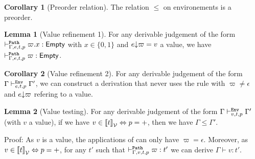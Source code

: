 \documentclass[a4paper]{article}
\theoremstyle{definition}
\newtheorem{lemma}{Lemma}
\newtheorem{corollary}{Corollary}
\begin{document}
        \begin{corollary}[Preorder relation]
          The relation $\leq$ on environements is a preorder.
        \end{corollary}

        \begin{lemma}[Value refinement 1]
          For any derivable judgement of the form $\pvdash \Gamma p e t \varpi.x:\Empty$ with $x\in\{0,1\}$ and $\occ e \varpi = v$ a value,
          we have $\pvdash \Gamma p e t \varpi:\Empty$.
        \end{lemma}

        \begin{corollary}[Value refinement 2]
          For any derivable judgement of the form $\Gamma \evdash p e t \Gamma'$, we can construct a derivation that
          never uses the rule  with $\varpi\neq\epsilon$ and $\occ e \varpi$ refering to a value.
        \end{corollary}

        \begin{lemma}[Value testing]
          For any derivable judgement of the form $\Gamma \evdash p v t \Gamma'$ (with $v$ a value), if we have $v \in \valsemantic{t} \Leftrightarrow p=+$,
          then we have $\Gamma\leq\Gamma'$.
        \end{lemma}
        Proof: As $v$ is a value, the applications of  can only have $\varpi=\epsilon$. Moreover, as $v \in \valsemantic{t} \Leftrightarrow p=+$,
        for any $t'$ such that $\pvdash \Gamma p v t \varpi:t'$ we can derive $\Gamma \vdash v:t'$.
\end{document}

